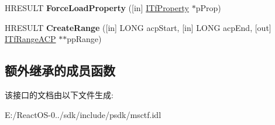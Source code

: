 \begin{DoxyCompactItemize}
\item 
\mbox{\label{interface_i_tf_context_owner_services_ab5552cde5239d7e2125b2f622a2ad6a1}} 
H\+R\+E\+S\+U\+LT {\bfseries Force\+Load\+Property} (\mbox{[}in\mbox{]} \hyperlink{interface_i_tf_property}{I\+Tf\+Property} $\ast$p\+Prop)
\item 
\mbox{\label{interface_i_tf_context_owner_services_a11a63617ff8b295664a20af543150d75}} 
H\+R\+E\+S\+U\+LT {\bfseries Create\+Range} (\mbox{[}in\mbox{]} L\+O\+NG acp\+Start, \mbox{[}in\mbox{]} L\+O\+NG acp\+End, \mbox{[}out\mbox{]} \hyperlink{interface_i_tf_range_a_c_p}{I\+Tf\+Range\+A\+CP} $\ast$$\ast$pp\+Range)
\end{DoxyCompactItemize}
\subsection*{额外继承的成员函数}


该接口的文档由以下文件生成\+:\begin{DoxyCompactItemize}
\item 
E\+:/\+React\+O\+S-\/0../sdk/include/psdk/msctf.\+idl\end{DoxyCompactItemize}
